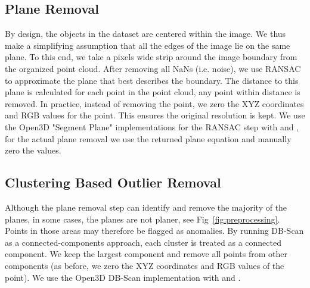 \documentclass{article}
\begin{document}
\subsection{Plane Removal} By design, the objects in the dataset are centered within the image. We thus make a simplifying assumption that all the edges of the image lie on the same plane. To this end, we take a  pixels wide strip around the image boundary from the organized point cloud. After removing all NaNs (i.e. noise), we use RANSAC \cite{ransac} to approximate the plane that best describes the boundary. The distance to this plane is calculated for each point in the point cloud, any point within  distance is removed.
In practice, instead of removing the point, we zero the XYZ coordinates and RGB values for the point. This ensures the original resolution is kept. We use the Open3D \cite{open3d} "Segment Plane" implementations for the RANSAC step with  and , for the actual plane removal we use the returned plane equation and manually zero the values.

\subsection{Clustering Based Outlier Removal} Although the plane removal step can identify and remove the majority of the planes, in some cases, the planes are not planer, see Fig~\ref{fig:preprocessing}. Points in those areas may therefore be flagged as anomalies. By running DB-Scan \cite{dbscan} as a connected-components approach, each cluster is treated as a connected component. We keep the largest component and remove all points from other components (as before, we zero the XYZ coordinates and RGB values of the point).  We use the Open3D \cite{open3d} DB-Scan implementation with  and .
\end{document}
